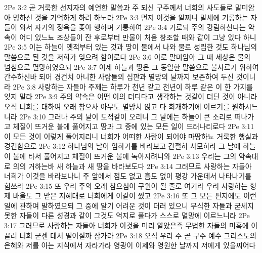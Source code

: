 2Pe 3:2  곧 거룩한 선지자의 예언한 말씀과 주 되신 구주께서 너희의 사도들로 말미암아 명하신 것을 기억하게 하려 하노라
2Pe 3:3  먼저 이것을 알찌니 말세에 기롱하는 자들이 와서 자기의 정욕을 좇아 행하며 기롱하여
2Pe 3:4  가로되 주의 강림하신다는 약속이 어디 있느뇨 조상들이 잔 후로부터 만물이 처음 창조할 때와 같이 그냥 있다 하니
2Pe 3:5  이는 하늘이 옛적부터 있는 것과 땅이 물에서 나와 물로 성립한 것도 하나님의 말씀으로 된 것을 저희가 잊으려 함이로다
2Pe 3:6  이로 말미암아 그 때 세상은 물의 넘침으로 멸망하였으되
2Pe 3:7  이제 하늘과 땅은 그 동일한 말씀으로 불사르기 위하여 간수하신바 되어 경건치 아니한 사람들의 심판과 멸망의 날까지 보존하여 두신 것이니라
2Pe 3:8  사랑하는 자들아 주께는 하루가 천년 같고 천년이 하루 같은 이 한 가지를 잊지 말라
2Pe 3:9  주의 약속은 어떤 이의 더디다고 생각하는 것같이 더딘 것이 아니라 오직 너희를 대하여 오래 참으사 아무도 멸망치 않고 다 회개하기에 이르기를 원하시느니라
2Pe 3:10  그러나 주의 날이 도적같이 오리니 그 날에는 하늘이 큰 소리로 떠나가고 체질이 뜨거운 불에 풀어지고 땅과 그 중에 있는 모든 일이 드러나리로다
2Pe 3:11  이 모든 것이 이렇게 풀어지리니 너희가 어떠한 사람이 되어야 마땅하뇨 거룩한 행실과 경건함으로
2Pe 3:12  하나님의 날이 임하기를 바라보고 간절히 사모하라 그 날에 하늘이 불에 타서 풀어지고 체질이 뜨거운 불에 녹아지려니와
2Pe 3:13  우리는 그의 약속대로 의의 거하는바 새 하늘과 새 땅을 바라보도다
2Pe 3:14  그러므로 사랑하는 자들아 너희가 이것을 바라보나니 주 앞에서 점도 없고 흠도 없이 평강 가운데서 나타나기를 힘쓰라
2Pe 3:15  또 우리 주의 오래 참으심이 구원이 될 줄로 여기라 우리 사랑하는 형제 바울도 그 받은 지혜대로 너희에게 이같이 썼고
2Pe 3:16  또 그 모든 편지에도 이런 일에 관하여 말하였으되 그 중에 알기 어려운 것이 더러 있으니 무식한 자들과 굳세지 못한 자들이 다른 성경과 같이 그것도 억지로 풀다가 스스로 멸망에 이르느니라
2Pe 3:17  그러므로 사랑하는 자들아 너희가 이것을 미리 알았은즉 무법한 자들의 미혹에 이끌려 너희 굳센 데서 떨어질까 삼가라
2Pe 3:18  오직 우리 주 곧 구주 예수 그리스도의 은혜와 저를 아는 지식에서 자라가라 영광이 이제와 영원한 날까지 저에게 있을찌어다


